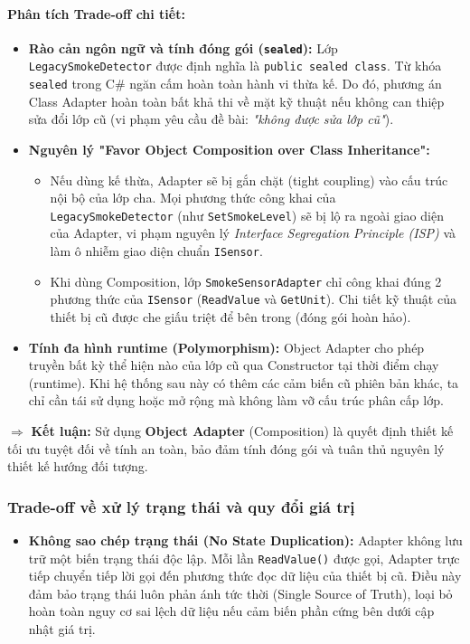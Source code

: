 \documentclass[11pt,a4paper]{article}
\begin{document}
\paragraph{Phân tích Trade-off chi tiết:}
\begin{itemize}[itemsep=1.5pt]
    \item \textbf{Rào cản ngôn ngữ và tính đóng gói (\texttt{sealed}):} Lớp \texttt{LegacySmokeDetector} được định nghĩa là \texttt{public sealed class}. Từ khóa \texttt{sealed} trong C\# ngăn cấm hoàn toàn hành vi thừa kế. Do đó, phương án Class Adapter hoàn toàn bất khả thi về mặt kỹ thuật nếu không can thiệp sửa đổi lớp cũ (vi phạm yêu cầu đề bài: \textit{"không được sửa lớp cũ"}).
    \item \textbf{Nguyên lý "Favor Object Composition over Class Inheritance":}
    \begin{itemize}
        \item Nếu dùng kế thừa, Adapter sẽ bị gắn chặt (tight coupling) vào cấu trúc nội bộ của lớp cha. Mọi phương thức công khai của \texttt{LegacySmokeDetector} (như \texttt{SetSmokeLevel}) sẽ bị lộ ra ngoài giao diện của Adapter, vi phạm nguyên lý \textit{Interface Segregation Principle (ISP)} và làm ô nhiễm giao diện chuẩn \texttt{ISensor}.
        \item Khi dùng Composition, lớp \texttt{SmokeSensorAdapter} chỉ công khai đúng 2 phương thức của \texttt{ISensor} (\texttt{ReadValue} và \texttt{GetUnit}). Chi tiết kỹ thuật của thiết bị cũ được che giấu triệt để bên trong (đóng gói hoàn hảo).
    \end{itemize}
    \item \textbf{Tính đa hình runtime (Polymorphism):} Object Adapter cho phép truyền bất kỳ thể hiện nào của lớp cũ qua Constructor tại thời điểm chạy (runtime). Khi hệ thống sau này có thêm các cảm biến cũ phiên bản khác, ta chỉ cần tái sử dụng hoặc mở rộng mà không làm vỡ cấu trúc phân cấp lớp.
\end{itemize}
$\Rightarrow$ \textbf{Kết luận:} Sử dụng \textbf{Object Adapter} (Composition) là quyết định thiết kế tối ưu tuyệt đối về tính an toàn, bảo đảm tính đóng gói và tuân thủ nguyên lý thiết kế hướng đối tượng.

\subsubsection{Trade-off về xử lý trạng thái và quy đổi giá trị}
\begin{itemize}[itemsep=1.2pt]
    \item \textbf{Không sao chép trạng thái (No State Duplication):} Adapter không lưu trữ một biến trạng thái độc lập. Mỗi lần \texttt{ReadValue()} được gọi, Adapter trực tiếp chuyển tiếp lời gọi đến phương thức đọc dữ liệu của thiết bị cũ. Điều này đảm bảo trạng thái luôn phản ánh tức thời (Single Source of Truth), loại bỏ hoàn toàn nguy cơ sai lệch dữ liệu nếu cảm biến phần cứng bên dưới cập nhật giá trị.
\end{itemize}
\end{document}
